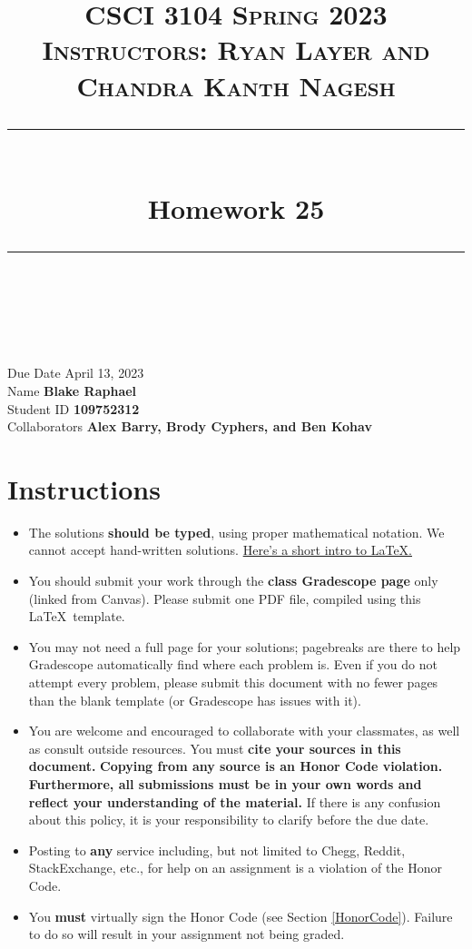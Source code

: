 \documentclass[11pt]{article}
\title{
\normalfont \normalsize
\textsc{CSCI 3104 Spring 2023 \\
Instructors: Ryan Layer and Chandra Kanth Nagesh} \\
[10pt]
\rule{\linewidth}{0.5pt} \\[6pt]
\huge Homework 25 \\
\rule{\linewidth}{2pt}  \\[10pt]
}
\author{}
\date{}
\theoremstyle{definition}
\theoremstyle{definition}
\theoremstyle{definition}
\begin{document}

\maketitle


\noindent
Due Date \dotfill April 13, 2023 \\
Name \dotfill \textbf{Blake Raphael} \\
Student ID \dotfill \textbf{109752312} \\
Collaborators \dotfill \textbf{Alex Barry, Brody Cyphers, and Ben Kohav}

\tableofcontents

\section{Instructions}
 \begin{itemize}
	\item The solutions \textbf{should be typed}, using proper mathematical notation. We cannot accept hand-written solutions. \href{http://ece.uprm.edu/~caceros/latex/introduction.pdf}{Here's a short intro to \LaTeX.}
	\item You should submit your work through the \textbf{class Gradescope page} only (linked from Canvas). Please submit one PDF file, compiled using this \LaTeX \ template.
	\item You may not need a full page for your solutions; pagebreaks are there to help Gradescope automatically find where each problem is. Even if you do not attempt every problem, please submit this document with no fewer pages than the blank template (or Gradescope has issues with it).

	\item You are welcome and encouraged to collaborate with your classmates, as well as consult outside resources. You must \textbf{cite your sources in this document.} \textbf{Copying from any source is an Honor Code violation. Furthermore, all submissions must be in your own words and reflect your understanding of the material.} If there is any confusion about this policy, it is your responsibility to clarify before the due date. 

	\item Posting to \textbf{any} service including, but not limited to Chegg, Reddit, StackExchange, etc., for help on an assignment is a violation of the Honor Code.

	\item You \textbf{must} virtually sign the Honor Code (see Section \ref{HonorCode}). Failure to do so will result in your assignment not being graded.
\end{itemize}
\end{document}

